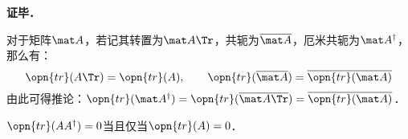 \textbf{证毕．}

\begin{exercise}{}\label{trace_exe1}
对于矩阵$\mat A$，若记其转置为$\mat A\Tr$，共轭为$\overline{\mat A}$，厄米共轭为$\mat A^\dagger$，那么有：
\begin{equation}
\opn{tr}(A\Tr)=\opn{tr}(A), \qquad \opn{tr}(\overline{\mat A})=\overline{\opn{tr}(\mat A)}
\end{equation}
由此可得推论：$\opn{tr}(\mat A^\dagger)=\opn{tr}(\overline{\mat A\Tr})=\overline{\opn{tr}(\mat A)}$．
\end{exercise}

\begin{example}{}
$\opn{tr}(AA^\dagger)=0$当且仅当$\opn{tr}(A)=0$．
\end{example}




